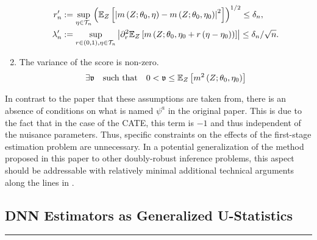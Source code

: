 \begin{boxD}
\begin{asm}
\begin{enumerate}
\begin{align}
                r_{n}^{\prime}
                & :=\sup_{\eta \in \mathcal{T}_{n}}\left(\mathbb{E}_{Z}\left[\left|m\left(Z; \theta_0, \eta\right)-m\left(Z; \theta_0, \eta_0\right)\right|^2\right]\right)^{1 / 2} 
                \leq \delta_{n}, \\
                \lambda_{n}^{\prime}
                & :=\sup_{r \in(0,1), \eta \in \mathcal{T}_{n}}\left|\partial_r^2 \mathbb{E}_{Z}\left[m\left(Z; \theta_0, \eta_0+r\left(\eta-\eta_0\right)\right)\right]\right| 
                \leq \delta_{n} / \sqrt{n} .
            \end{align}
            \item The variance of the score is non-zero.
            \begin{equation}
                \exists \mathfrak{v} \quad \text{such that} \quad 
                0 < \mathfrak{v} \leq \mathbb{E}_{Z}\left[m^{2}\left(Z; \theta_0, \eta_0\right)\right]
            \end{equation}
        \end{enumerate}
    \end{asm}    
\end{boxD}
In contrast to the paper that these assumptions are taken from, there is an absence of conditions on what is named $\psi^{a}$ in the original paper.   This is due to the fact that in the case of the CATE, this term is $-1$ and thus independent of the nuisance parameters.
Thus, specific constraints on the effects of the first-stage estimation problem are unnecessary.
In a potential generalization of the method proposed in this paper to other doubly-robust inference problems, this aspect should be addressable with relatively minimal additional technical arguments along the lines in \citet{chernozhukov_doubledebiased_2018}.

\subsection{DNN Estimators as Generalized U-Statistics}\label{sec:U_stat}
\hrule

